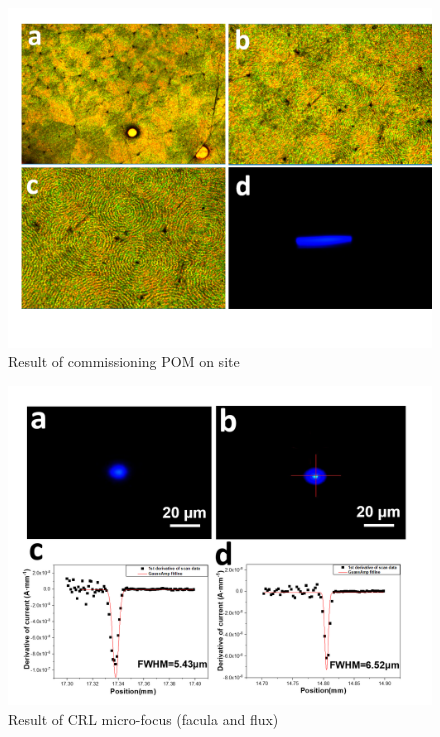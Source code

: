 \begin{figure}
    \centering
    \includegraphics[scale=0.6]{Figures/Fig5CommissionPOMOnSite.png}
    \caption{Result of commissioning POM on site}
    \label{pictures}
\end{figure}


\begin{figure}
    \centering
    \includegraphics[scale=0.6]{Figures/Fig6CRLmicrofocus.png}
    \caption{Result of CRL micro-focus (facula and flux)}
    \label{fitting}
\end{figure}